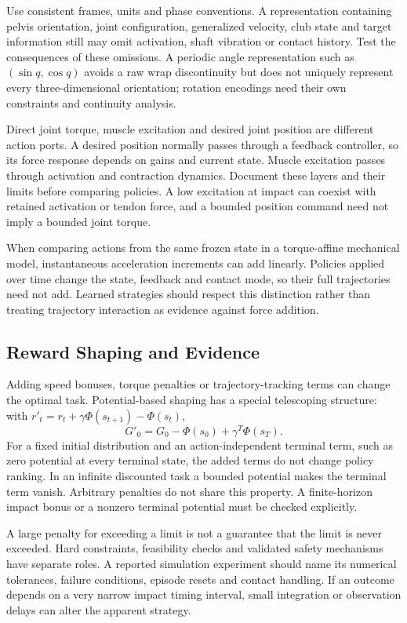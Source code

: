 Use consistent frames, units and phase conventions. A representation containing pelvis orientation, joint configuration, generalized velocity, club state and target information still may omit activation, shaft vibration or contact history. Test the consequences of these omissions. A periodic angle representation such as $(\sin q,\cos q)$ avoids a raw wrap discontinuity but does not uniquely represent every three-dimensional orientation; rotation encodings need their own constraints and continuity analysis.

Direct joint torque, muscle excitation and desired joint position are different action ports. A desired position normally passes through a feedback controller, so its force response depends on gains and current state. Muscle excitation passes through activation and contraction dynamics. Document these layers and their limits before comparing policies. A low excitation at impact can coexist with retained activation or tendon force, and a bounded position command need not imply a bounded joint torque.

When comparing actions from the same frozen state in a torque-affine mechanical model, instantaneous acceleration increments can add linearly. Policies applied over time change the state, feedback and contact mode, so their full trajectories need not add. Learned strategies should respect this distinction rather than treating trajectory interaction as evidence against force addition.

\subsection{Reward Shaping and Evidence}

Adding speed bonuses, torque penalties or trajectory-tracking terms can change the optimal task. Potential-based shaping has a special telescoping structure: with $r'_t=r_t+\gamma\Phi(s_{t+1})-\Phi(s_t)$,
\begin{equation}
G'_0=G_0-\Phi(s_0)+\gamma^T\Phi(s_T).
\end{equation}
For a fixed initial distribution and an action-independent terminal term, such as zero potential at every terminal state, the added terms do not change policy ranking. In an infinite discounted task a bounded potential makes the terminal term vanish. Arbitrary penalties do not share this property. A finite-horizon impact bonus or a nonzero terminal potential must be checked explicitly.

A large penalty for exceeding a limit is not a guarantee that the limit is never exceeded. Hard constraints, feasibility checks and validated safety mechanisms have separate roles. A reported simulation experiment should name its numerical tolerances, failure conditions, episode resets and contact handling. If an outcome depends on a very narrow impact timing interval, small integration or observation delays can alter the apparent strategy.

